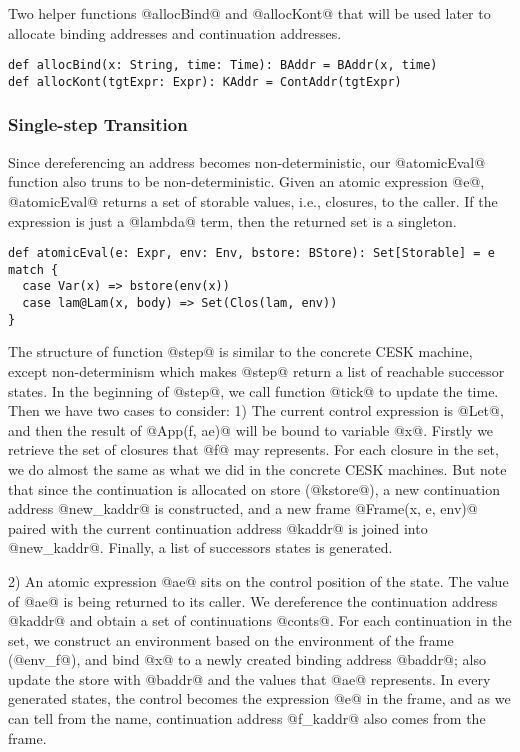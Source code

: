 \documentclass[acmsmall,review,anonymous]{acmart}\settopmatter{printfolios=true,printccs=false,printacmref=false}
\begin{document}
Two helper functions @allocBind@ and @allocKont@ that will be used later
to allocate binding addresses and continuation addresses.

\begin{lstlisting}
def allocBind(x: String, time: Time): BAddr = BAddr(x, time)
def allocKont(tgtExpr: Expr): KAddr = ContAddr(tgtExpr)
\end{lstlisting}

\subsubsection{Single-step Transition}

Since dereferencing an address becomes non-deterministic, our @atomicEval@
function also truns to be non-deterministic. Given an atomic expression @e@,
@atomicEval@ returns a set of storable values, i.e., closures, to the caller.
If the expression is just a @lambda@ term, then the returned set is a singleton.

\begin{lstlisting}
def atomicEval(e: Expr, env: Env, bstore: BStore): Set[Storable] = e match {
  case Var(x) => bstore(env(x))
  case lam@Lam(x, body) => Set(Clos(lam, env))
}
\end{lstlisting}

The structure of function @step@ is similar to the concrete CESK machine, 
except non-determinism which makes @step@ return a list of reachable successor states.
In the beginning of @step@, we call function @tick@ to update the time.
Then we have two cases to consider: 1) The current control expression is @Let@,
and then the result of @App(f, ae)@ will be bound to variable @x@.
Firstly we retrieve the set of closures that @f@ may represents.
For each closure in the set, we do almost the same as what we did in the concrete 
CESK machines. But note that since the continuation is allocated on store (@kstore@),
a new continuation address @new_kaddr@ is constructed, and a new frame
@Frame(x, e, env)@ paired with the current continuation address @kaddr@
is joined into @new_kaddr@. Finally, a list of successors states is generated.

2) An atomic expression @ae@ sits on the control position of the state.
The value of @ae@ is being returned to its caller. 
We dereference the continuation address @kaddr@ and obtain a set of
continuations @conts@.
For each continuation in the set, we construct an environment based on the
environment of the frame (@env_f@), and bind @x@ to a newly created binding 
address @baddr@; also update the store with @baddr@ and 
the values that @ae@ represents. In every generated states,
the control becomes the expression @e@ in the frame,
and as we can tell from the name, continuation address @f_kaddr@
also comes from the frame.
\end{document}
